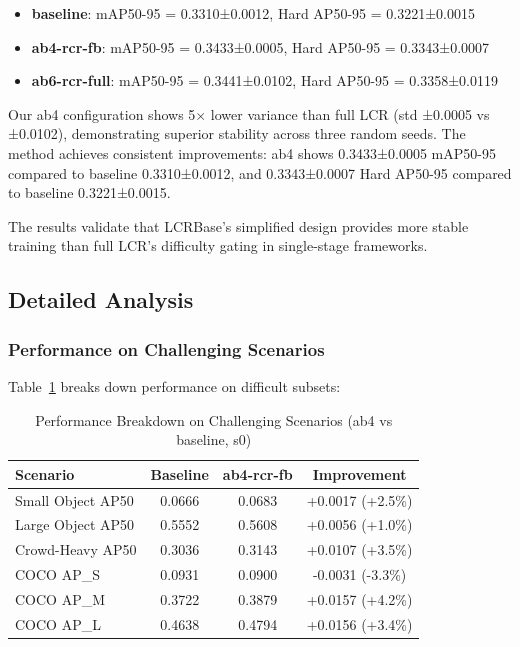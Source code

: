 \documentclass[journal]{IEEEtran}
\begin{document}
\begin{itemize}
    \item \textbf{baseline}: mAP50-95 = 0.3310±0.0012, Hard AP50-95 = 0.3221±0.0015
    \item \textbf{ab4-rcr-fb}: mAP50-95 = 0.3433±0.0005, Hard AP50-95 = 0.3343±0.0007
    \item \textbf{ab6-rcr-full}: mAP50-95 = 0.3441±0.0102, Hard AP50-95 = 0.3358±0.0119
\end{itemize}

Our ab4 configuration shows 5× lower variance than full LCR (std ±0.0005 vs ±0.0102), demonstrating superior stability across three random seeds. The method achieves consistent improvements: ab4 shows 0.3433±0.0005 mAP50-95 compared to baseline 0.3310±0.0012, and 0.3343±0.0007 Hard AP50-95 compared to baseline 0.3221±0.0015.

The results validate that LCRBase's simplified design provides more stable training than full LCR's difficulty gating in single-stage frameworks.

\subsection{Detailed Analysis}

\subsubsection{Performance on Challenging Scenarios}

Table~\ref{tab:hard_breakdown} breaks down performance on difficult subsets:

\begin{table}[t]
\caption{Performance Breakdown on Challenging Scenarios (ab4 vs baseline, s0)}
\label{tab:hard_breakdown}
\centering
\small
\setlength{\tabcolsep}{2.5pt}
\begin{tabular}{lccc}
\toprule
\textbf{Scenario} & \textbf{Baseline} & \textbf{ab4-rcr-fb} & \textbf{Improvement} \\
\midrule
Small Object AP50 & 0.0666 & 0.0683 & +0.0017 (+2.5\%) \\
Large Object AP50 & 0.5552 & 0.5608 & +0.0056 (+1.0\%) \\
Crowd-Heavy AP50 & 0.3036 & 0.3143 & +0.0107 (+3.5\%) \\
COCO AP\_S & 0.0931 & 0.0900 & -0.0031 (-3.3\%) \\
COCO AP\_M & 0.3722 & 0.3879 & +0.0157 (+4.2\%) \\
COCO AP\_L & 0.4638 & 0.4794 & +0.0156 (+3.4\%) \\
\bottomrule
\end{tabular}
\end{table}
\end{document}
